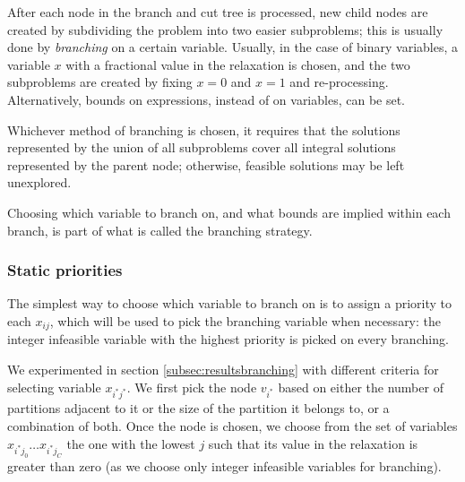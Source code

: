 After each node in the branch and cut tree is processed, new child nodes are created by subdividing the problem into two easier subproblems; this is usually done by \textit{branching} on a certain variable. Usually, in the case of binary variables, a variable $x$ with a fractional value in the relaxation is chosen, and the two subproblems are created by fixing $x = 0$ and $x = 1$ and re-processing. Alternatively, bounds on expressions, instead of on variables, can be set.

\begin{figure}[h]
	\label{fig:branching}
	\centering
\end{figure}

Whichever method of branching is chosen, it requires that the solutions represented by the union of all subproblems cover all integral solutions represented by the parent node; otherwise, feasible solutions may be left unexplored.

Choosing which variable to branch on, and what bounds are implied within each branch, is part of what is called the branching strategy. 

\subsubsection{Static priorities}

The simplest way to choose which variable to branch on is to assign a priority to each $x_{ij}$, which will be used to pick the branching variable when necessary: the integer infeasible variable with the highest priority is picked on every branching. 

We experimented in section \ref{subsec:resultsbranching} with different criteria for selecting variable $x_{i^*j^*}$. We first pick the node $v_{i^*}$ based on either the number of partitions adjacent to it or the size of the partition it belongs to, or a combination of both. Once the node is chosen, we choose from the set of variables $x_{i^*j_0} \ldots x_{i^*j_C}$ the one with the lowest $j$ such that its value in the relaxation is greater than zero (as we choose only integer infeasible variables for branching).

